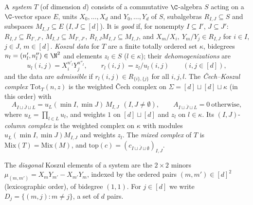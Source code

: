 \begin{definition}\label{pf:hlf-chart:def:sys}
A \emph{system} $T$ (of dimension $d$) consists of a commutative $\C$-algebra $S$ acting on a $\C$-vector space $E$, units
$X_0,\dots,X_d$ and $Y_0,\dots,Y_d$ of $S$, subalgebras $R_{I,J}\subseteq S$ and subspaces $M_{I,J}\subseteq E$ ($I,J\subseteq[d]$). It is
\emph{good} if, for nonempty $I\subseteq I'$, $J\subseteq J'$: $R_{I,J}\subseteq R_{I',J'}$, $M_{I,J}\subseteq M_{I',J'}$, $R_{I,J}M_{I,J}\subseteq M_{I,J}$,
and $X_m/X_i,\ Y_m/Y_j\in R_{I,J}$ for $i\in I$, $j\in J$, $m\in[d]$. \emph{Koszul data} for $T$ are a finite totally ordered set $\kappa$,
bidegrees $n_l=(n_l',n_l'')\in\N^2$ and elements $z_l\in S$ ($l\in\kappa$); their \emph{dehomogenizations} are
\[
  u_l(i,j)=X_i^{n'_l}Y_j^{n''_l},\qquad r_l(i,j)=z_l/u_l(i,j)\qquad(i,j\in[d]),
\]
and the data are \emph{admissible} if $r_l(i,j)\in R_{\{i\},\{j\}}$ for all $i,j,l$. The \emph{\v{C}ech--Koszul complex}
$\mathrm{Tot}_T(n,z)$ is the weighted \v{C}ech complex on $\Sigma=[d]\sqcup[d]\sqcup\kappa$ (in this order) with
\[
  A_{I\sqcup\bar J\sqcup L}=u_L(\min I,\min J)\,M_{I,J}\ \ (I,J\ne\emptyset),\qquad A_{I\sqcup\bar J\sqcup L}=0\ \text{otherwise},
\]
where $u_L=\prod_{l\in L}u_l$, and weights $1$ on $[d]\sqcup[d]$ and $z_l$ on $l\in\kappa$. Its $(I,J)$-\emph{column complex} is the weighted complex
on $\kappa$ with modules $u_L(\min I,\min J)M_{I,J}$ and weights $z_l$. The \emph{mixed complex} of $T$ is $\mathrm{Mix}(T)=\mathrm{Mix}(M)$, and
$\mathrm{top}(c)=(c_{I\sqcup\bar J\sqcup\emptyset})_{I,J}$.
\end{definition}

The \emph{diagonal} Koszul elements of a system are the $2\times2$ minors $\mu_{(m,m')}=X_mY_{m'}-X_{m'}Y_m$, indexed by the ordered pairs
$(m,m')\in[d]^2$ (lexicographic order), of bidegree $(1,1)$. For $j\in[d]$ we write $D_j=\{(m,j):m\ne j\}$, a set of $d$ pairs.

